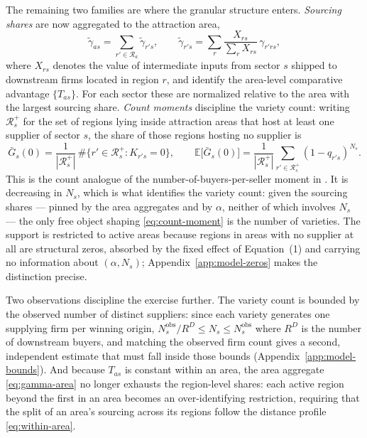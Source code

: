 The remaining two families are where the granular structure enters. \emph{Sourcing shares} are
now aggregated to the attraction area,
\begin{equation}
\tilde\gamma_{as}=\sum_{r'\in\mathcal{R}_{a}}\tilde\gamma_{r's},
\qquad
\tilde\gamma_{r's}=\sum_{r}\frac{X_{rs}}{\sum_{r}X_{rs}}\,\gamma_{r'rs},
\label{eq:gamma-area}
\end{equation}
where $X_{rs}$ denotes the value of intermediate inputs from sector $s$ shipped to downstream
firms located in region $r$, and identify the area-level comparative advantage $\{T_{as}\}$.
For each sector these are normalized relative to the area with the largest sourcing share.
\emph{Count moments} discipline the variety count: writing $\mathcal{R}^{+}_{s}$ for the set of
regions lying inside attraction areas that host at least one supplier of sector $s$, the share
of those regions hosting no supplier is
\begin{equation}
\bar G_{s}(0)=\frac{1}{|\mathcal{R}^{+}_{s}|}\,
\#\big\{r'\in\mathcal{R}^{+}_{s}:K_{r's}=0\big\},
\qquad
\mathbb{E}\big[\bar G_{s}(0)\big]
=\frac{1}{|\mathcal{R}^{+}_{s}|}\sum_{r'\in\mathcal{R}^{+}_{s}}(1-q_{r's})^{N_{s}} .
\label{eq:count-moment}
\end{equation}
This is the count analogue of the number-of-buyers-per-seller moment in \citet{lmm2023}. It is
decreasing in $N_{s}$, which is what identifies the variety count: given the sourcing shares
--- pinned by the area aggregates and by $\alpha$, neither of which involves $N_{s}$ --- the
only free object shaping \eqref{eq:count-moment} is the number of varieties. The support is
restricted to active areas because regions in areas with no supplier at all are structural
zeros, absorbed by the fixed effect of Equation~(1) and carrying no information about
$(\alpha,N_{s})$; Appendix~\ref{app:model-zeros} makes the distinction precise.

Two observations discipline the exercise further. The variety count is bounded by the observed
number of distinct suppliers: since each variety generates one supplying firm per winning
origin, $N^{\mathrm{obs}}_{s}/R^{D}\le N_{s}\le N^{\mathrm{obs}}_{s}$ where $R^{D}$ is the
number of downstream buyers, and matching the observed firm count gives a second, independent
estimate that must fall inside those bounds (Appendix~\ref{app:model-bounds}). And because
$T_{as}$ is constant within an area, the area aggregate \eqref{eq:gamma-area} no longer
exhausts the region-level shares: each active region beyond the first in an area becomes an
over-identifying restriction, requiring that the split of an area's sourcing across its regions
follow the distance profile \eqref{eq:within-area}.

